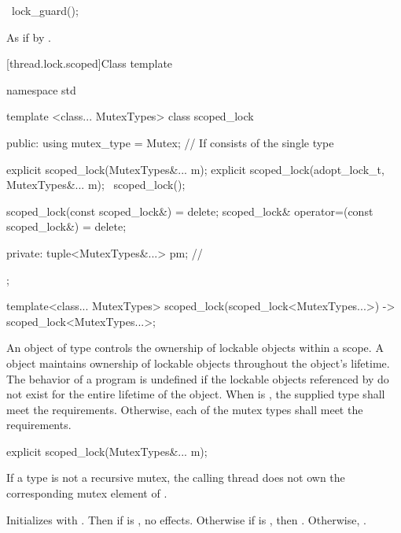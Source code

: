 %
\begin{itemdecl}
~lock_guard();
\end{itemdecl}

\begin{itemdescr}
\pnum
\effects As if by .
\end{itemdescr}


[thread.lock.scoped]{Class template }

%
\begin{codeblock}
namespace std {
  template <class... MutexTypes>
  class scoped_lock {
  public:
    using mutex_type = Mutex;  // If  consists of the single type 

    explicit scoped_lock(MutexTypes&... m);
    explicit scoped_lock(adopt_lock_t, MutexTypes&... m);
    ~scoped_lock();

    scoped_lock(const scoped_lock&) = delete;
    scoped_lock& operator=(const scoped_lock&) = delete;

  private:
    tuple<MutexTypes&...> pm; // \expos
  };

  template<class... MutexTypes>
    scoped_lock(scoped_lock<MutexTypes...>) -> scoped_lock<MutexTypes...>;
}
\end{codeblock}

\pnum
An object of type  controls the ownership of lockable objects
within a scope. A  object maintains ownership of lockable
objects throughout the  object's lifetime.
The behavior of a program is undefined if the lockable objects referenced by
 do not exist for the entire lifetime of the 
object.
When  is ,
the supplied  type
shall meet the  requirements.
Otherwise, each of the mutex types
shall meet the  requirements.

%
\begin{itemdecl}
explicit scoped_lock(MutexTypes&... m);
\end{itemdecl}

\begin{itemdescr}
\pnum
\requires If a  type is not a recursive mutex,
the calling thread does not own the corresponding mutex element of .

\pnum
\effects Initializes  with .
Then if  is , no effects.
Otherwise if  is , then .
Otherwise, .
\end{itemdescr}

